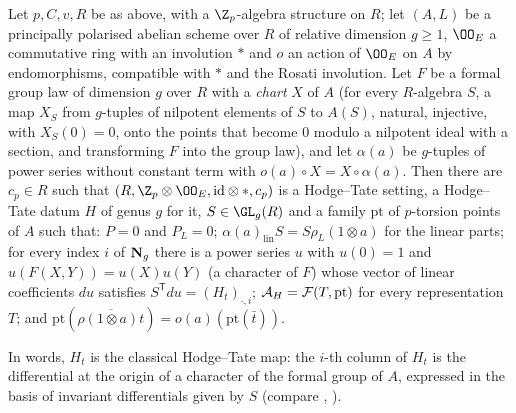 \begin{proposition}\label{pf:tower:fgchart}
Let $p,C,v,R$ be as above, with a $\Z_p$-algebra structure on $R$; let $(A,L)$ be a principally polarised
abelian scheme over $R$ of relative dimension $g\ge1$, $\OO_E$ a commutative ring with an involution $*$ and
$o$ an action of $\OO_E$ on $A$ by endomorphisms, compatible with $*$ and the Rosati involution. Let $F$ be a
formal group law of dimension $g$ over $R$ with a \emph{chart} $X$ of $A$ (for every $R$-algebra $S$, a map
$X_S$ from $g$-tuples of nilpotent elements of $S$ to $A(S)$, natural, injective, with $X_S(0)=0$, onto the
points that become $0$ modulo a nilpotent ideal with a section, and transforming $F$ into the group law),
and let $\alpha(a)$ be $g$-tuples of power series without constant term with $o(a)\circ X=X\circ\alpha(a)$.
Then there are $c_p\in R$ such that $(R,\Z_p\otimes\OO_E,\mathrm{id}\otimes*,c_p)$ is a Hodge--Tate setting, a
Hodge--Tate datum $H$ of genus $g$ for it, $S\in\GL_g(R)$ and a family $\mathrm{pt}$ of $p$-torsion points of
$A$ such that: $P=0$ and $P_L=0$; $\alpha(a)_{\mathrm{lin}}S=S\rho_L(1\otimes a)$ for the linear parts;
for every index $i$ of $\mathbf N_g$ there is a power series $u$ with $u(0)=1$ and $u(F(X,Y))=u(X)u(Y)$ (a
character of $F$) whose vector of linear coefficients $du$ satisfies $S^{\mathsf T}du=(H_t)_{\cdot,i}$;
$\mathcal A_H=\mathcal F(T,\mathrm{pt})$ for every representation $T$; and
$\mathrm{pt}(\overline{\rho(1\otimes a)t})=o(a)(\mathrm{pt}(\bar t))$.
\end{proposition}

In words, $H_t$ is the classical Hodge--Tate map: the $i$-th column of $H_t$ is the differential at the origin
of a character of the formal group of $A$, expressed in the basis of invariant differentials given by $S$
(compare \cite[\S4]{Tate1967pdiv}, \cite{Fontaine1982fd}).

